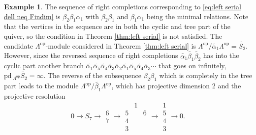 \documentclass{conm-p-l}
\newcommand{\pd}{\mathrm{pd}\,}
\newcommand{\op}{\mathrm{op}}
\theoremstyle{definition}
\newtheorem{example}[theorem]{Example}
\theoremstyle{remark}
\numberwithin{equation}{section}
\begin{document}
\begin{example}
The sequence of right completions corresponding to \eqref{eq:left serial dell neq Findim} is $\beta_2\beta_1\alpha_1$ with $\beta_2\beta_1$ and $\beta_1\alpha_1$ being the minimal relations. Note that the vertices in the sequence are in both the cyclic and tree part of the quiver, so the condition in Theorem \ref{thm:left serial} is not satisfied. The candidate $\Lambda^{\op}$-module considered in Theorem \ref{thm:left serial} is $\Lambda^{\op}/\widetilde{\alpha_1}\Lambda^{\op}=\widetilde{S_2}$. However, since the reversed sequence of right completions $\widetilde{\alpha_1}\widetilde{\beta_1}\widetilde{\beta_2}$ has into the cyclic part another branch $\widetilde{\alpha_1}\widetilde{\alpha_5}\widetilde{\alpha_4}\widetilde{\alpha_3}\widetilde{\alpha_2}\widetilde{\alpha_1}\widetilde{\alpha_5}\widetilde{\alpha_4}\widetilde{\alpha_3}\cdots$ that goes on infinitely, $\pd\!_{\Lambda^{\op}} \widetilde{S_2} = \infty$. The reverse of the subsequence $\beta_2\beta_1$ which is completely in the tree part leads to the module $\Lambda^{\op}/\widetilde{\beta_1}\Lambda^{\op}$, which has projective dimension 2 and the projective resolution
\[
0 \to S_7 \to \begin{matrix} 6 \\ 7 \end{matrix} \to \begin{matrix} {} & 1 & {} \\ 5 & {} & 6 \\ 4 & {} & {} \\ 3 & {} & {} \end{matrix} \to \begin{matrix} 1 \\ 5 \\ 4 \\ 3 \end{matrix} \to 0.
\]


\end{example}
\end{document}
